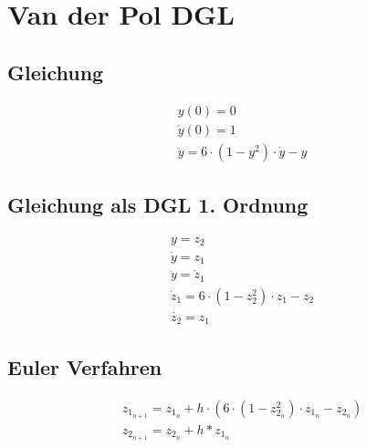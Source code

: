 \documentclass[10pt]{scrartcl}
\author{Oliver Steenbuck, Karolina Bernat}
\title{\titletext}
\date{31.10.2012}
\begin{document}
\maketitle
\setcounter{tocdepth}{3}
\tableofcontents
\listoffigures
\lstlistoflistings

\section{Van der Pol DGL}
	\subsection{Gleichung}
		\begin{align}
		&y(0) = 0\\
		&\dot{y}(0) = 1\\
		&\ddot{y} = 6 \cdot (1-y^2) \cdot \dot{y} -y
		\end{align}
	\subsection{Gleichung als DGL 1. Ordnung}
		\begin{align}
			&y = z_2\\
			&\dot{y} = z_1\\
			&\ddot{y} = \dot{z}_1\\
			&\dot{z}_1 = 6 \cdot (1-z_2^2) \cdot z_1 - z_2\\
			&\dot{z_2} = z_1
		\end{align}
		
	\subsection{Euler Verfahren}
	\begin{align}
		&z_{1_{n+1}} = z_{1_{n}} + h \cdot (6 \cdot (1-z_{2_{n}}^2) \cdot z_{1_{n}} - z_{2_{n}})\\
		&z_{2_{n+1}} = z_{2_n} + h * z_{1_n}
	\end{align}
	
	
	
\end{document}
